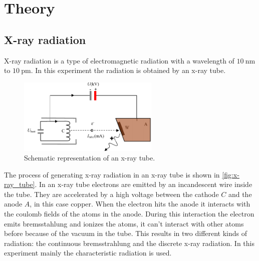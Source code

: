 \section{Theory}
\label{sec:Theory}

\subsection{X-ray radiation}
X-ray radiation is a type of electromagnetic radiation with a wavelength of $\qty{10}{\nano\meter}$ to $\qty{10}{\pico\meter}$.
In this experiment the radiation is obtained by an x-ray tube.
\begin{figure}
    \centering
    \includegraphics[width=0.6\textwidth]{images/x-ray_tube.pdf}
    \caption{Schematic representation of an x-ray tube. \cite{V44:strahlung_krieger}}
    \label{fig:x-ray_tube}
\end{figure}
The process of generating x-ray radiation in an x-ray tube is shown in \autoref{fig:x-ray_tube}.
In an x-ray tube electrons are emitted by an incandescent wire inside the tube.
They are accelerated by a high voltage between the cathode $C$ and the anode $A$, in this case copper.
When the electron hits the anode it interacts with the coulomb fields of the atoms in the anode.
During this interaction the electron emits bremsstahlung and ionizes the atoms, it can't interact with other atoms before because of the vacuum in the tube.
This results in two different kinds of radiation: the continuous bremsstrahlung and the discrete x-ray radiation.
In this experiment mainly the characteristic radiation is used.

